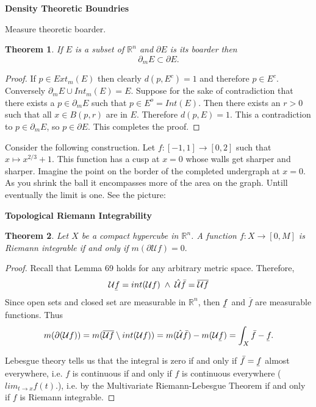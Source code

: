 \documentclass[letter]{article}
\newtheorem{theorem}{Theorem}
\newenvironment{menumerate}{%
  \edef\backupindent{\the\parindent}%
  \enumerate%
  \setlength{\parindent}{\backupindent}%
}{\endenumerate}
\newcommand{\ubar}[1]{\underaccent{\bar}{#1}}
\begin{document}
\begin{menumerate}
	\setcounter{enumi}{86}
	\item \textbf{Density Theoretic Boundries}
	\begin{menumerate}
		\item Measure theoretic boarder.
		\begin{theorem}
			If $E$ is a subset of $\mathbb{R}^n$ and $\partial E$ is its boarder then
		    $$\partial_m E \subset \partial E. $$
		\end{theorem}
		\begin{proof}
			If $p \in Ext_m(E)$ then clearly $d(p, E^c) =1$ and therefore $p \in E^c.$
			Conversely $\partial_m E \cup Int_m(E) = E.$ Suppose for the sake of contradiction
			that there exists a $p \in \partial_m E$ such that $p \in E^{o} = Int(E).$
			Then there exists an $r > 0$ such that all $x \in B(p,r)$ are in $E.$ Therefore
			$d(p,E) = 1.$ This a contradiction to $p \in \partial_m E$, so $p \in \partial E.$
			This completes the proof.
		\end{proof}

		\item Consider the following construction. Let $f: [-1,1] \to [0,2]$ such that $x \mapsto x^{2/3} + 1.$
		This function has a cusp at $x = 0$ whose walls get sharper and sharper. Imagine the point on the border of the completed undergraph
		at $x = 0.$ As you shrink the ball it encompasses more of the area on the graph. Untill eventually the limit is one.
		See the picture: \\[3in]
	\end{menumerate}
	\item \textbf{Topological Riemann Integrability}
	\begin{theorem}
		Let $X$ be a compact hypercube in $\mathbb{R}^n$. A function $f: X \to [0, M]$ is Riemann integrable if and only if
		$m(\partial \mathcal{U} f) = 0.$
	\end{theorem}
	\begin{proof}
		Recall that Lemma 69 holds for any arbitrary metric space. Therefore,
		\begin{equation}
			\mathcal{U} \ubar{f} = int(\mathcal{U}f)\;\wedge\;\hat{\mathcal{U}} \bar{f}  = \overline{\mathcal{U} f}
		\end{equation}
		Since open sets and closed set are measurable in $\mathbb{R}^n$, then $\ubar{f}$ and $\overline{f}$ are measurable functions.
		Thus
		\begin{equation}
			m(\partial(\mathcal{U} f)) = m(\overline{\mathcal{U} f} \setminus int(\mathcal{U} f)) 
			= m(\hat{\mathcal{U}} \bar{f}) - m(\mathcal{U} \ubar{f}) = \int_X \bar{f} - \ubar{f}.
		\end{equation}

		Lebesgue theory tells us that the integral is zero if and only if $\bar{f} = \ubar{f}$ almost everywhere, i.e. $f$ is continuous if and only if $f$ is continuous everywhere ($lim_{t\to x} f(t).$), i.e. by the Multivariate Riemann-Lebesgue Theorem if and only if $f$ is Riemann integrable.
	\end{proof}
\end{menumerate}
\end{document}
